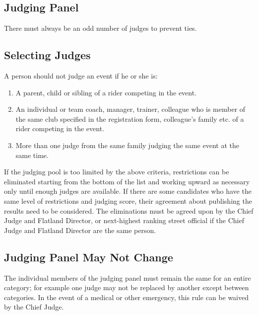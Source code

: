 \subsection{Judging Panel}

There must always be an odd number of judges to prevent ties. 

\subsection{Selecting Judges}
A person should not judge an event if he or she is:
\begin{enumerate}
\item A parent, child or sibling of a rider competing in the event.
\item An individual or team coach, manager, trainer, colleague who is member of the same club specified in the registration form, colleague's family etc. of a rider competing in the event.
\item More than one judge from the same family judging the same event at the same time.
\end{enumerate}

If the judging pool is too limited by the above criteria, restrictions can be eliminated starting from the bottom of the list and working upward as necessary only until enough judges are available.
If there are some candidates who have the same level of restrictions and judging score, their agreement about publishing the results need to be considered.
The eliminations must be agreed upon by the Chief Judge and Flatland Director, or next-highest ranking street official if the Chief Judge and Flatland Director are the same person.

\subsection{Judging Panel May Not Change}

The individual members of the judging panel must remain the same for an entire category; for example one judge may not be replaced by another except between categories.
In the event of a medical or other emergency, this rule can be waived by the Chief Judge.

